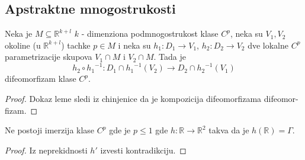 \documentclass[a4paper,12pt]{article}
\newcommand{\RR}{\mathbb{R}}
\begin{document}
\subsection{Apstraktne mnogostrukosti}

\begin{lema}
Neka je $M \subseteq \RR^{k+l}$ $k$ - dimenziona podmnogostrukost klase $C^p$, neka su $V_1, V_2$ okoline (u $\RR^{k+l}$) tachke $p \in M$ i neka su $h_1 : D_1 \to V_1$, $h_2: D_2 \to V_2$ dve lokalne $C^p$ parametrizacije skupova $V_1 \cap M$ i $V_2 \cap M$. Tada je
\[h_2 \circ {h_1}^{-1} : D_1 \cap {h_1}^{-1}(V_2) \to D_2 \cap {h_2}^{-1}(V_1)\]
difeomorfizam klase $C^p$.
\end{lema}
\begin{proof}
Dokaz leme sledi iz chinjenice da je kompozicija difeomorfizama difeomor-fizam.
\end{proof}

\begin{tvr}
Ne postoji imerzija klase $C^p$ gde je $p \leq 1$ gde $h: \RR \to \RR^2$ takva da je $h(\RR) = \Gamma$.
\end{tvr}
\begin{proof}
Iz neprekidnosti $h'$ izvesti kontradikciju.
\end{proof}
\end{document}
